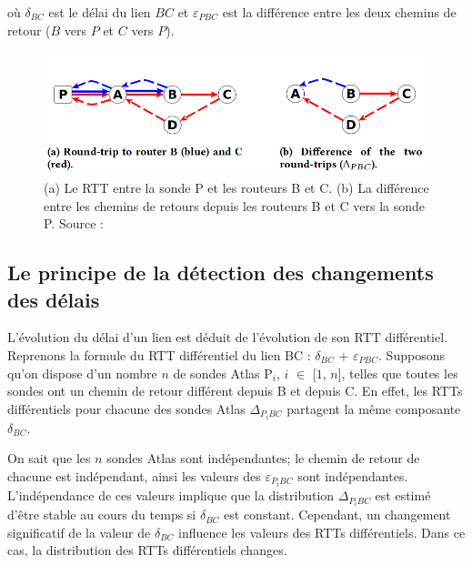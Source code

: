 où $\delta_{BC}$ est le délai du lien $BC$ et $\varepsilon_{PBC}$ est la différence entre les deux chemins de retour ($B$ vers $P$ et $C$ vers $P$). 
\begin{figure}[H]
	\centering
		\captionsetup{justification= centering}
	\includegraphics[width=0.7\linewidth]{illustrations/rtt-differ}
	\caption{(a) Le RTT entre la sonde P et les routeurs B et C. (b) La différence entre les  chemins de retours depuis les routeurs B et C vers la sonde P. Source : \cite{DBLP:journals/corr/FontugneAPB16}}
	\label{fig:rtt-differ}
\end{figure}

\subsection{Le principe de la détection des changements des délais}

L'évolution du délai d'un lien est déduit de l'évolution de son RTT différentiel. Reprenons la formule du RTT différentiel du lien BC :  $\delta_{BC}$ + $\varepsilon_{PBC}$. Supposons qu'on dispose d'un nombre $n$ de sondes Atlas P$_i$, $i$ $\in$ [$1$, $n$], telles que toutes les sondes ont un chemin de retour différent depuis B et depuis C.  En effet, les RTTs différentiels pour chacune des sondes Atlas $\Delta_{P{_i}BC}$ partagent la même composante $\delta_{BC}$.

On sait que les $n$ sondes Atlas sont indépendantes; le chemin de retour de chacune est indépendant, ainsi les valeurs des  $\varepsilon_{P_{i}BC}$ sont  indépendantes. L'indépendance de ces valeurs implique que la distribution $\Delta_{P_{i}BC}$ est estimé d'être stable au cours du temps si $\delta_{BC}$ est constant. Cependant, un changement significatif de la valeur de $\delta_{BC}$ influence les valeurs des RTTs différentiels. Dans ce cas, la distribution des RTTs différentiels changes. 


